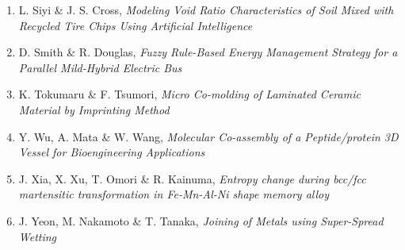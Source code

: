 \begin{enumerate}[label=A\arabic*]
\item L. Siyi \& J. S. Cross, {\em  Modeling Void Ratio Characteristics of Soil
Mixed with Recycled Tire Chips Using Artificial
Intelligence}

\item D. Smith \& R. Douglas, {\em Fuzzy Rule-Based Energy Management Strategy
for a Parallel Mild-Hybrid Electric Bus}

\item K. Tokumaru \& F. Tsumori, {\em Micro Co-molding of Laminated Ceramic
Material by Imprinting Method}

\item Y. Wu, A. Mata \& W. Wang, {\em Molecular Co-assembly of a Peptide/protein 3D
Vessel for Bioengineering Applications}

\item   J. Xia, X. Xu, T. Omori \& R. Kainuma, {\em Entropy change during bcc/fcc martensitic
transformation in Fe-Mn-Al-Ni shape memory
alloy}

\item J. Yeon, M. Nakamoto \& T. Tanaka, {\em Joining of Metals using Super-Spread Wetting}


\end{enumerate}
\newpage
{}%
\renewcommand*{\thepage}{A\arabic{page}}





 

 

 

 

 

 

 

 

 

